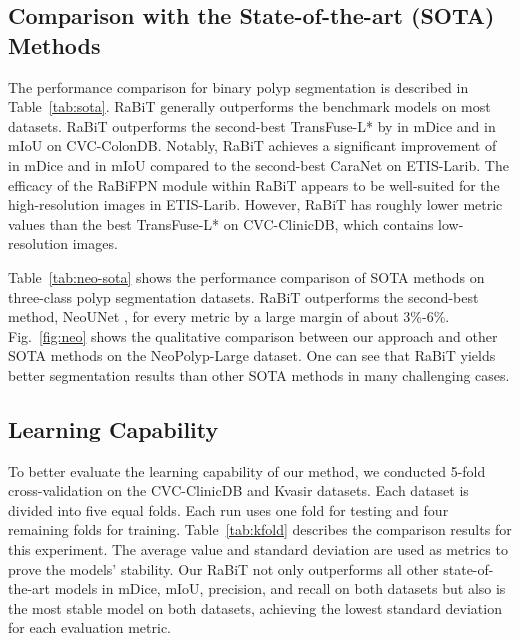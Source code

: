 \documentclass{article}
\begin{document}
\subsection{Comparison with the State-of-the-art (SOTA) Methods}
The performance comparison for binary polyp segmentation is described in Table~\ref{tab:sota}. RaBiT generally outperforms the benchmark models on most datasets.  RaBiT outperforms the second-best TransFuse-L* by  in mDice and  in mIoU on CVC-ColonDB. Notably, RaBiT achieves a significant improvement of  in mDice and  in mIoU compared to the second-best CaraNet \cite{caranet} on ETIS-Larib. The efficacy of the RaBiFPN module within RaBiT appears to be well-suited for the high-resolution images in ETIS-Larib. However, RaBiT has roughly  lower metric values than the best TransFuse-L* on CVC-ClinicDB, which contains low-resolution images.

Table~\ref{tab:neo-sota} shows the performance comparison of SOTA methods on three-class polyp segmentation datasets. RaBiT outperforms the second-best method, NeoUNet \cite{ngoc2021neounet}, for every metric by a large margin of about 3\%-6\%. Fig.~\ref{fig:neo} shows the qualitative comparison between our approach and other SOTA methods on the NeoPolyp-Large dataset. One can see that RaBiT yields better segmentation results than other SOTA methods in many challenging cases.

\subsection{Learning Capability}
To better evaluate the learning capability of our method, we conducted 5-fold cross-validation on the CVC-ClinicDB and Kvasir datasets. Each dataset is divided into five equal folds. Each run uses one fold for testing and four remaining folds for training. Table~\ref{tab:kfold} describes the comparison results for this experiment. The average value and standard deviation are used as metrics to prove the models' stability. Our RaBiT not only outperforms all other state-of-the-art models in mDice, mIoU, precision, and recall on both datasets but also is the most stable model on both datasets, achieving the lowest standard deviation for each evaluation metric.
\end{document}
